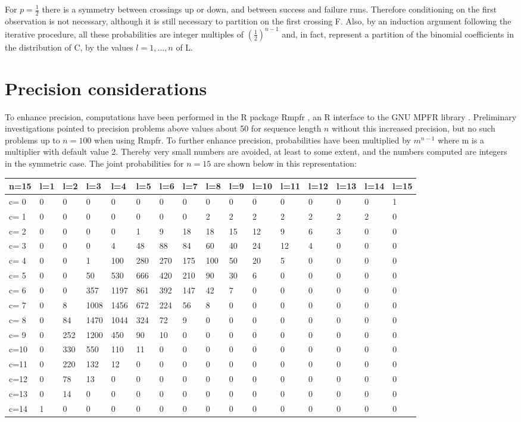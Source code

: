 For $p=\frac{1}{2}$ there is a symmetry between crossings up or down, and between success and failure runs. Therefore conditioning on the first observation is not necessary, although it is still necessary to partition on the first crossing F. Also, by an induction argument following the iterative procedure, all these probabilities are integer multiples of ${\left( \frac{1}{2} \right)}^{n-1}$ and, in fact, represent a partition of the binomial coefficients in the distribution of C, by the values $l=1, \ldots ,n$ of L.  

\section{Precision considerations}

To enhance precision, computations have been performed in the R package Rmpfr \citep{Rmpfr}, an R interface to the GNU MPFR library \citep{FouLHLPZ-2007}. Preliminary investigations pointed to precision problems above values about 50 for sequence length $n$ without this increased precision, but no such problems up to $n=100$ when using Rmpfr. To further enhance precision, probabilities have been multiplied by $m^{n-1}$ where m is a multiplier with default value 2. Thereby very small numbers are avoided, at least to some extent, and the numbers computed are integers in the symmetric case. The joint probabilities for $n=15$ are shown below in this representation:

\tiny{
\begin{tabular}{l | l l l l l l l l l l l l l l l}
\hline
n=15&l=1&l=2&l=3&l=4&l=5&l=6&l=7&l=8&l=9&l=10&l=11&l=12&l=13&l=14&l=15\\
\hline
c= 0& 0& 0& 0& 0& 0& 0& 0& 0& 0& 0& 0& 0& 0& 0& 1\\
c= 1& 0& 0& 0& 0& 0& 0& 0& 2& 2& 2& 2& 2& 2& 2& 0\\
c= 2& 0& 0& 0& 0& 1& 9& 18& 18& 15& 12& 9& 6& 3& 0& 0\\
c= 3& 0& 0& 0& 4& 48& 88& 84& 60& 40& 24& 12& 4& 0& 0& 0\\
c= 4& 0& 0& 1& 100& 280& 270& 175& 100& 50& 20& 5& 0& 0& 0& 0\\
c= 5& 0& 0& 50& 530& 666& 420& 210& 90& 30& 6& 0& 0& 0& 0& 0\\
c= 6& 0& 0& 357& 1197& 861& 392& 147& 42& 7& 0& 0& 0& 0& 0& 0\\
c= 7& 0& 8& 1008& 1456& 672& 224& 56& 8& 0& 0& 0& 0& 0& 0& 0\\
c= 8& 0& 84& 1470& 1044& 324& 72& 9& 0& 0& 0& 0& 0& 0& 0& 0\\
c= 9& 0& 252& 1200& 450& 90& 10& 0& 0& 0& 0& 0& 0& 0& 0& 0\\
c=10& 0& 330& 550& 110& 11& 0& 0& 0& 0& 0& 0& 0& 0& 0& 0\\
c=11& 0& 220& 132& 12& 0& 0& 0& 0& 0& 0& 0& 0& 0& 0& 0\\
c=12& 0& 78& 13& 0& 0& 0& 0& 0& 0& 0& 0& 0& 0& 0& 0\\
c=13& 0& 14& 0& 0& 0& 0& 0& 0& 0& 0& 0& 0& 0& 0& 0\\
c=14& 1& 0& 0& 0& 0& 0& 0& 0& 0& 0& 0& 0& 0& 0& 0\\
\hline
\end{tabular}
}

